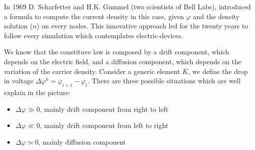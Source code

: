  In 1969 D. Scharfetter and H.K. Gummel (two scientists of Bell Labs), introduced a formula to compute the current density in this case, given $\varphi$ and the density solution ($n$) on every nodes. This innovative approach led for the twenty years to follow every simulation which contemplates electric-devices. 
 
We know that the constituve law is composed by a drift component, which depends on the electric field, and a diffusion component, which depends on the variation of the carrier density. Consider a generic element $K$, we define the drop in voltage $\Delta \varphi^k=\varphi_{i+1}-\varphi_{i}$. There are three possible situations which are well explain in the picture:
\begin{itemize}
\item $\Delta \varphi \gg0$, mainly drift component from right to left 
\item $\Delta \varphi \ll0$, mainly drift component from left to right
\item $\Delta \varphi \simeq 0$, mainly diffusion component
\end{itemize} 
 

